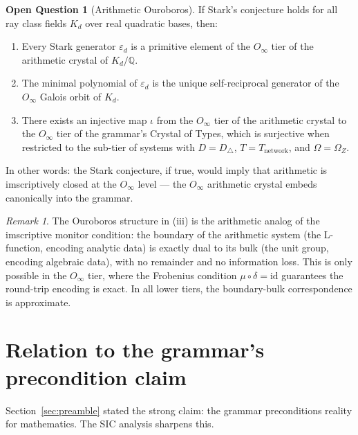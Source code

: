 \documentclass[12pt]{article}
\theoremstyle{plain}
\theoremstyle{definition}
\newtheorem{questioninner}[theoreminner]{Open Question}
\theoremstyle{remark}
\newtheorem{remark}[theoreminner]{Remark}
\newcommand{\bQ}{\mathbb{Q}}
\newcommand{\epsd}{\varepsilon_d}
\begin{document}
\begin{mdframed}[style=defstyle]
\begin{questioninner}[Arithmetic Ouroboros]
\label{conj:ouroboros}
If Stark's conjecture holds for all ray class fields $K_d$ over real quadratic bases, then:
\begin{enumerate}
  \item[(i)] Every Stark generator $\epsd$ is a primitive element of the $O_\infty$ tier of
    the arithmetic crystal of $K_d/\bQ$.
  \item[(ii)] The minimal polynomial of $\epsd$ is the unique self-reciprocal generator of
    the $O_\infty$ Galois orbit of $K_d$.
  \item[(iii)] There exists an injective map $\iota$ from the $O_\infty$ tier of the
    arithmetic crystal to the $O_\infty$ tier of the grammar's Crystal of Types, which
    is surjective when restricted to the sub-tier of systems with $D = D_\triangle$,
    $T = T_\text{network}$, and $\Omega = \Omega_Z$.
\end{enumerate}
In other words: the Stark conjecture, if true, would imply that arithmetic is imscriptively
closed at the $O_\infty$ level — the $O_\infty$ arithmetic crystal embeds canonically into the
grammar.
\end{questioninner}
\end{mdframed}

\begin{remark}
The Ouroboros structure in (iii) is the arithmetic analog of the imscriptive monitor condition:
the boundary of the arithmetic system (the L-function, encoding analytic data) is exactly dual
to its bulk (the unit group, encoding algebraic data), with no remainder and no information
loss. This is only possible in the $O_\infty$ tier, where the Frobenius condition
$\mu \circ \delta = \mathrm{id}$ guarantees the round-trip encoding is exact. In all lower
tiers, the boundary-bulk correspondence is approximate.
\end{remark}

\section{Relation to the grammar's precondition claim}
\label{sec:precondition}

Section~\ref{sec:preamble} stated the strong claim: the grammar preconditions reality for
mathematics. The SIC analysis sharpens this.
\end{document}

